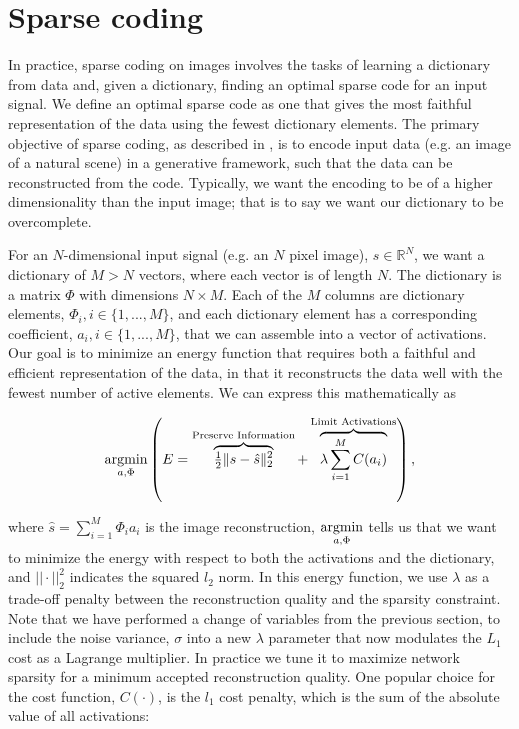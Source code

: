\section{Sparse coding}
In practice, sparse coding on images involves the tasks of learning a dictionary from data and, given a dictionary, finding an optimal sparse code for an input signal. We define an optimal sparse code as one that gives the most faithful representation of the data using the fewest dictionary elements. The primary objective of sparse coding, as described in \parencite{olshausen1997sparse}, is to encode input data (e.g. an image of a natural scene) in a generative framework, such that the data can be reconstructed from the code. Typically, we want the encoding to be of a higher dimensionality than the input image; that is to say we want our dictionary to be overcomplete.

For an $N$-dimensional input signal (e.g. an $N$ pixel image), $s \in \mathbb{R}^{N}$, we want a dictionary of $M > N$ vectors, where each vector is of length $N$. The dictionary is a matrix $\Phi$ with dimensions $N \times M$. Each of the $M$ columns are dictionary elements, $\Phi_{i}, i \in \{1,...,M\}$, and each dictionary element has a corresponding coefficient, $a_{i}, i \in \{1,...,M\}$, that we can assemble into a vector of activations. Our goal is to minimize an energy function that requires both a faithful and efficient representation of the data, in that it reconstructs the data well with the fewest number of active elements. We can express this mathematically as

\begin{equation}\label{eq:ch2_sparse_energy}
    \argmin\limits_{a, \Phi}
        \left( E =
            \overbrace{ \tfrac{1}{2} \| s - \hat{s} \|_{2}^{2} }^\text{Preserve Information} +
        \overbrace{ \lambda \sum\limits_{i=1}^{M}C(a_{i}) }^\text{Limit Activations} \right),
\end{equation}

\noindent where $\hat{s} = \sum\limits_{i=1}^{M}\Phi_{i}a_{i}$ is the image reconstruction, $\argmin\limits_{a, \Phi}$ tells us that we want to minimize the energy with respect to both the activations and the dictionary, and $||\cdot||_2^2$ indicates the squared $l_2$ norm. In this energy function, we use $\lambda$ as a trade-off penalty between the reconstruction quality and the sparsity constraint. Note that we have performed a change of variables from the previous section, to include the noise variance, $\sigma$ into a new $\lambda$ parameter that now modulates the $L_{1}$ cost as a Lagrange multiplier. In practice we tune it to maximize network sparsity for a minimum accepted reconstruction quality. One popular choice for the cost function, $C(\cdot)$, is the $l_1$ cost penalty, which is the sum of the absolute value of all activations:

